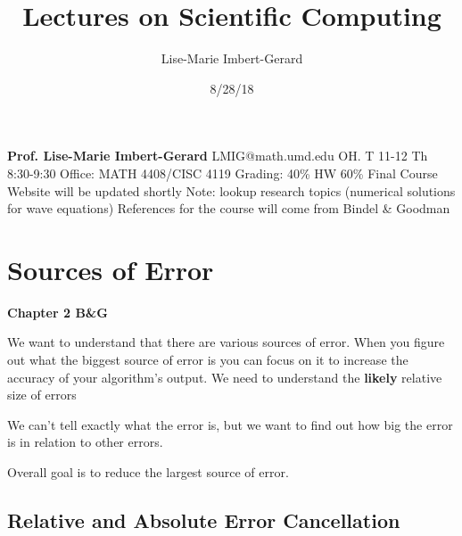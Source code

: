 \documentclass{article}
\title{Lectures on Scientific Computing}
\date{8/28/18}
\author{Lise-Marie Imbert-Gerard}
\newcommand{\n}{\newline}
\begin{document}
	\maketitle
	
	\begin{flushleft}
			\textbf{Prof. Lise-Marie Imbert-Gerard} \n
			LMIG@math.umd.edu OH. T 11-12 Th 8:30-9:30 \n
			Office: MATH 4408/CISC 4119 \n
			Grading: 40\% HW 60\%  Final \n \n
			Course Website will be updated shortly \n	
			Note: lookup research topics (numerical solutions for wave equations) \n
			References for the course will come from Bindel \& Goodman
	\end{flushleft}
	
	\section{Sources of Error}
	
	\begin{flushleft}
	\textbf{Chapter 2 B\&G}
	
	We want to understand that there are various sources of error.  When you figure out what the biggest source of error is you can focus on it to increase the accuracy of your algorithm's output.  We need to understand the \textbf{likely} relative size of errors \n
	
	We can't tell exactly what the error is, but we want to find out how big the error is in relation to other errors.  \n
	
	Overall goal is to reduce the largest source of error. \n
	
	\end{flushleft}
	
	\subsection{Relative and Absolute Error Cancellation}
	
\end{document}
